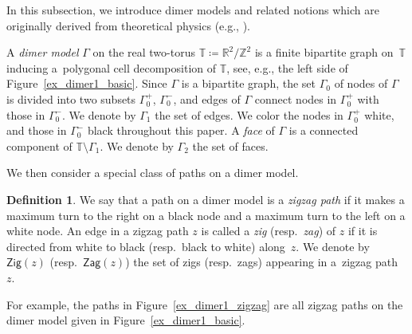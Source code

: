 \documentclass[pdftex]{sigma}
\numberwithin{equation}{section}
\theoremstyle{definition}
\newtheorem{Definition}[Theorem]{Definition}
\newcommand{\ZZ}{\mathbb{Z}}
\newcommand{\RR}{\mathbb{R}}
\newcommand{\TT}{\mathbb{T}}
\newcommand{\Zig}{\mathsf{Zig}}
\newcommand{\Zag}{\mathsf{Zag}}
\begin{document}
In this subsection, we introduce dimer models and related notions which are originally derived from theoretical physics (e.g., \cite{fra_etal_gauge,FHK,HV}).

A \emph{dimer model} $\Gamma$ on the real two-torus $\TT\coloneqq\RR^2/\ZZ^2$ is a finite bipartite graph on~$\TT$
inducing a~polygonal cell decomposition of $\TT$, see, e.g., the left side of Figure~\ref{ex_dimer1_basic}.
Since $\Gamma$ is a bipartite graph, the set $\Gamma_0$ of nodes of $\Gamma$ is divided into two subsets $\Gamma_0^+$, $\Gamma_0^-$,
and edges of $\Gamma$ connect nodes in $\Gamma_0^+$ with those in $\Gamma_0^-$. We denote by $\Gamma_1$ the set of edges.
We color the nodes in $\Gamma_0^+$ white, and those in $\Gamma_0^-$ black throughout this paper.
A \emph{face} of $\Gamma$ is a connected component of $\TT{\setminus}\Gamma_1$. We denote by $\Gamma_2$ the set of faces.

We then consider a special class of paths on a dimer model.

\begin{Definition}\label{def_zigzag}
We say that a path on a dimer model is a \emph{zigzag path} if it makes a maximum turn to the right on a black node
and a maximum turn to the left on a white node.
An edge in a zigzag path $z$ is called a \emph{zig} (resp.\ \emph{zag}) of $z$ if it is directed from white to black (resp.\ black to white) along~$z$.
We denote by $\Zig(z)$ (resp.\ $\Zag(z)$) the set of zigs (resp.\ zags) appearing in a~zigzag path~$z$.
\end{Definition}

For example, the paths in Figure~\ref{ex_dimer1_zigzag} are all zigzag paths on the dimer model given in Figure~\ref{ex_dimer1_basic}.
\end{document}
